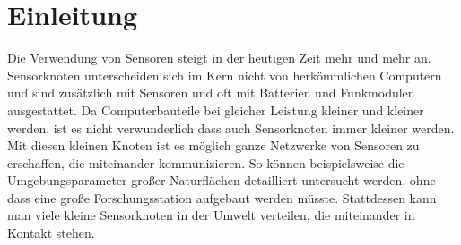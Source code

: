 \chapter{Einleitung}

Die Verwendung von Sensoren steigt in der heutigen Zeit mehr und mehr an. Sensorknoten unterscheiden sich im Kern nicht von herkömmlichen Computern und sind zusätzlich mit Sensoren und oft mit Batterien und Funkmodulen ausgestattet. Da Computerbauteile bei gleicher Leistung kleiner und kleiner werden, ist es nicht verwunderlich dass auch Sensorknoten immer kleiner werden. Mit diesen kleinen Knoten ist es möglich ganze Netzwerke von Sensoren zu erschaffen, die miteinander kommunizieren. So können beispielsweise die Umgebungsparameter großer Naturflächen detailliert untersucht werden, ohne dass eine große Forschungsstation aufgebaut werden müsste. Stattdessen kann man viele kleine Sensorknoten in der Umwelt verteilen, die miteinander in Kontakt stehen. 